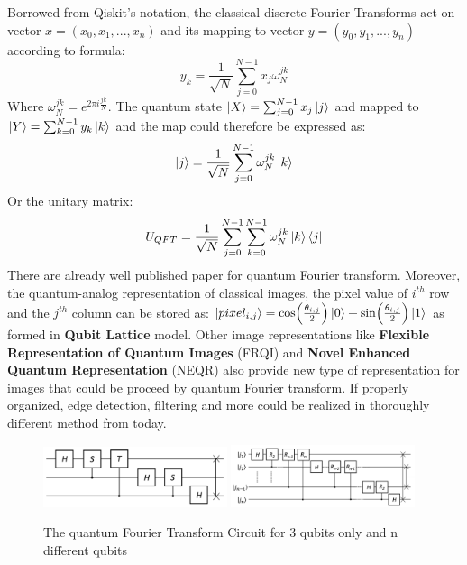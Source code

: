 \documentclass{article}
\begin{document}
Borrowed from Qiskit's notation, the classical discrete Fourier Transforms
act on vector $x = (x_0, x_1,...,x_n)$ and its mapping to vector $y = (y_0, y_1,...,y_n)$
according to formula:
\begin{equation}
  y_k = \frac{1}{\sqrt{N}} \sum^{N-1}_{j=0} x_j \omega_N^{jk}
\end{equation}
Where $\omega_N^{jk} = e^{2\pi i \frac{jk}{N}}$. The quantum state
$ \ket{X} = \sum^{N-1}_{j=0} x_j \ket{j} $ and mapped to $ \ket{Y} = \sum^{N-1}_{k=0} y_k \ket{k} $
and the map could therefore be expressed as:
\begin{equation}
  \ket{j}  = \frac{1}{\sqrt{N}} \sum^{N-1}_{j=0} \omega_N^{jk} \ket{k}
\end{equation}
Or the unitary matrix:
\begin{equation}
  U_{QFT}= \frac{1}{\sqrt{N}} \sum^{N-1}_{j=0} \sum^{N-1}_{k=0}  \omega_N^{jk} \ket{k} \bra{j}
\end{equation}
There are already well published paper for quantum Fourier transform. Moreover, 
the quantum-analog representation of classical images, the pixel value 
of $i^{th}$ row and the $j^{th}$ column can be stored as:
$\ket{pixel_{i,j}} = \cos(\frac{\theta_{i,j}}{2}) \ket{0} + 
\sin (\frac{\theta_{i,j}}{2}) \ket{1}$ as formed in \textbf{Qubit Lattice} model.
Other image representations like \textbf{Flexible Representation of 
Quantum Images} (FRQI) and \textbf{Novel Enhanced Quantum Representation} (NEQR) also 
provide new type of representation for images that could be proceed 
by quantum Fourier transform. If properly organized, edge detection, filtering 
and more could be realized in thoroughly different method from today.

\begin{figure}[h]
  \includegraphics[width=0.48\textwidth]{qft2.png}
  \includegraphics[width=0.48\textwidth]{qft1.png}
  \caption{The quantum Fourier Transform Circuit for 3 qubits only and 
  n different qubits}
\end{figure}
\end{document}
